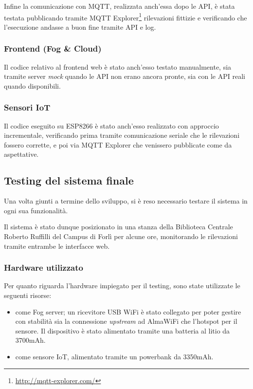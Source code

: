 Infine la comunicazione con MQTT, realizzata anch'essa dopo le API, è stata testata pubblicando tramite MQTT Explorer\footnote{\url{http://mqtt-explorer.com/}} rilevazioni fittizie e verificando che l'esecuzione andasse a buon fine tramite API e log.

\subsubsection[Frontend]{Frontend (Fog \& Cloud)}

Il codice relativo al frontend web è stato anch'esso testato manualmente, sia tramite server \emph{mock} quando le API non erano ancora pronte, sia con le API reali quando disponibili.

\subsubsection{Sensori IoT}

Il codice eseguito su ESP8266 è stato anch'esso realizzato con approccio incrementale, verificando prima tramite comunicazione seriale che le rilevazioni fossero corrette, e poi via MQTT Explorer che venissero pubblicate come da aspettative.

\subsection{Testing del sistema finale}

Una volta giunti a termine dello sviluppo, si è reso necessario testare il sistema in ogni sua funzionalità.

Il sistema è stato dunque posizionato in una stanza della Biblioteca Centrale Roberto Ruffilli del Campus di Forlì per alcune ore, monitorando le rilevazioni tramite entrambe le interfacce web.

\subsubsection{Hardware utilizzato}

Per quanto riguarda l'hardware impiegato per il testing, sono state utilizzate le seguenti risorse:

\begin{itemize}
  \item
     come Fog server;
    un ricevitore USB WiFi è stato collegato per poter gestire con stabilità sia la connessione \emph{upstream} ad AlmaWiFi che l'hotspot per il sensore.
    Il dispositivo è stato alimentato tramite una batteria al litio da 3700mAh.
  \item {} come sensore IoT, alimentato tramite un powerbank da 3350mAh.
\end{itemize}

